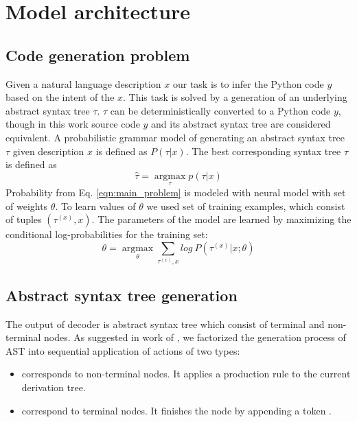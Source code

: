 \chapter{Model architecture} 
\label{Chapter4}

\section{Code generation problem}
Given a natural language description $x$ our task is to infer the Python code $y$ based on the intent of the $x$. This task is solved by a generation of an underlying abstract syntax tree $\tau$. $\tau$ can be deterministically converted to a Python code $y$, though in this work source code $y$ and its abstract syntax tree are considered equivalent. A probabilistic grammar model of generating an abstract syntax tree $\tau$ given description $x$ is defined as $P(\tau|x)$. The best corresponding syntax tree $\tau$ is defined as
\begin{equation}
\hat{\tau}=\underset{\tau}{\operatorname{argmax}} p(\tau|x)
\label{eqn:main_problem}
\end{equation}
Probability from Eq. \ref{eqn:main_problem} is modeled with neural model with set of weights $\theta$. To learn values of $\theta$ we used set of training examples, which consist of tuples $(\tau^{(x)}, x)$. The parameters of the model are learned by maximizing the conditional log-probabilities for the training set:
\begin{equation}
\theta=\underset{\theta}{\operatorname{argmax}} \sum_{\tau^{(x)}, x} log \: P(\tau^{(x)}|x; \theta)
\label{eqn:mle}
\end{equation}

\section{Abstract syntax tree generation}
The output of decoder is abstract syntax tree which consist of terminal and non-terminal nodes. As suggested in work of \cite{Yin2017}, we factorized the generation process of AST into sequential application of actions of two types:
\begin{itemize}
	\item {} corresponds to non-terminal nodes. It applies a production rule  to the current derivation tree.
	\item {} correspond to terminal nodes. It finishes the node by appending a token .
\end{itemize}


